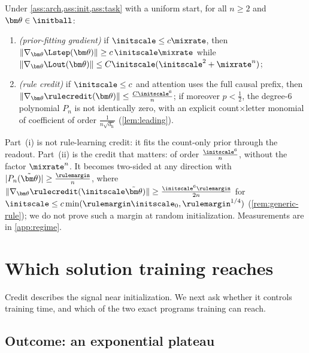 \begin{theorem}
\label{thm:separation}
Under \cref{ass:arch,ass:init,ass:task} with a uniform start, for all $n\ge2$ and $\bm\theta\in\initball$:
\begin{enumerate}[label=(\roman*),leftmargin=*,itemsep=0pt,topsep=2pt]
\item \emph{(prior-fitting gradient)} if $\initscale\le c\mixrate$, then $\|\nabla_{\bm\theta}\Lstep(\bm\theta)\|\ge c\,\initscale\mixrate$ while
$\|\nabla_{\bm\theta}\Lout(\bm\theta)\|\le C\initscale(\initscale^2+\mixrate^n)$;
\item \emph{(rule credit)} if $\initscale\le c$ and attention uses the full causal prefix, then $\|\nabla_{\bm\theta}\rulecredit(\bm\theta)\|\le \frac{C\initscale^6}{n}$; if
moreover $p<\tfrac{1}{2}$, the degree-$6$ polynomial $P_n$ is not identically zero, with an explicit count$\times$letter monomial of
coefficient of order $\frac{1}{n\sqrt{d_{\mathrm h}}}$
(\cref{lem:leading}).
\end{enumerate}
\end{theorem}

Part~(i) is not rule-learning credit: it fits the count-only prior through the readout. Part~(ii) is the credit that matters:
of order $\frac{\initscale^6}{n}$, without the factor $\mixrate^n$. It becomes two-sided at any direction with
$|P_n(\tilde{\bm\theta})|\ge\frac{\rulemargin}{n}$, where $\|\nabla_{\bm\theta}\rulecredit(\initscale\tilde{\bm\theta})\|\ge\frac{\initscale^6\rulemargin}{2n}$ for
$\initscale\le c\min(\rulemargin\initscale_0,\rulemargin^{1/4})$ (\cref{rem:generic-rule}); we do not prove such a margin at random
initialization. Measurements are in \cref{app:regime}.

\section{Which solution training reaches}
\label{sec:reach}

Credit describes the signal near initialization. We next ask whether it controls training time, and which of the two exact programs training can reach.

\subsection{Outcome: an exponential plateau}

